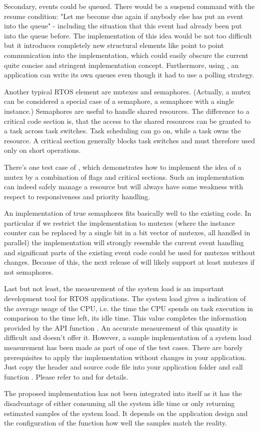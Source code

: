 Secondary, events could be queued. There would be a suspend command with
the resume condition: "Let me become due again if anybody else has put an
event into the queue" - including the situation that this event had
already been put into the queue before. The implementation of this idea
would be not too difficult but it introduces completely new structural
elements like point to point communication into the implementation, which
could easily obscure the current quite concise and stringent
implementation concept. Furthermore, using
, an \rtos{} application can write
its own queues even though it had to use a polling strategy.

Another typical RTOS element are mutexes and semaphores. (Actually, a
mutex can be considered a special case of a semaphore, a semaphore with a
single instance.) Semaphores are useful to handle shared resources. The
difference to a critical code section is, that the access to the shared
resources can be granted to a task across task switches. Task scheduling can
go on, while a task owns the resource. A critical section generally blocks
task switches and must therefore used only on short operations. 

There's one test case of \rtos{}, which demonstrates how to implement the
idea of a mutex by a combination of flags and critical sections. Such an
implementation can indeed safely manage a resource but will always have
some weakness with respect to responsiveness and priority handling.

An implementation of true semaphores fits basically well to the existing
code. In particular if we restrict the implementation to mutexes (where
the instance counter can be replaced by a single bit in a bit vector of
 mutexes, all handled in parallel) the implementation will
strongly resemble the current event handling and significant parts of the
existing event code could be used for mutexes without changes. Because of
this, the next release of \rtos{} will likely support at least mutexes if
not semaphores.

Last but not least, the measurement of the system load is an important
development tool for RTOS applications. The system load gives a indication
of the average usage of the CPU, i.e. the time the CPU spends on task
execution in comparison to the time left, its idle time. This value
completes the information provided by the API function
. An accurate measurement of this
quantity is difficult and \rtos{} doesn't offer it. However, a sample
implementation of a system load measurement has been made as part of one
of the test cases. There are barely prerequisites to apply the
implementation without changes in your \rtos{} application. Just copy the
header and source code file into your application folder and call function
. Please refer to  and
 for details.

The proposed implementation has not been integrated into \rtos{} itself as
it has the disadvantage of either consuming all the system idle time or
only returning estimated samples of the system load. It depends on the
application design and the configuration of the function how well the
samples match the reality.